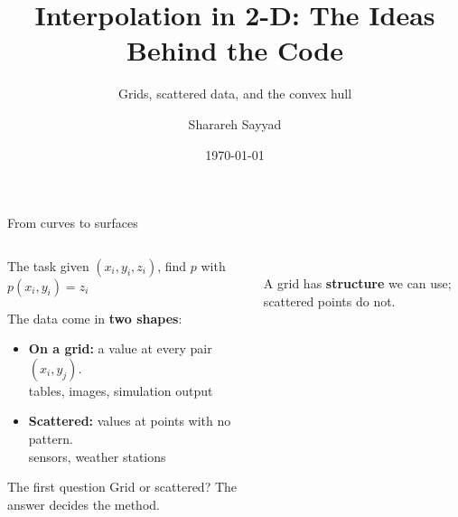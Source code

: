 \documentclass[aspectratio=169]{beamer}
\title{Interpolation in 2-D: The Ideas Behind the Code}
\subtitle{Grids, scattered data, and the convex hull}
\author{Sharareh Sayyad}
\institute{Washington State University}
\date{\today}
\newcommand{\cbox}[2]{\colorbox{#1}{\ensuremath{\displaystyle #2}}}
\begin{document}
\frame{\titlepage}

\begin{frame}{From curves to surfaces}
\begin{columns}[c]
\begin{column}{0.46\textwidth}
\small
\begin{block}{The task}
\footnotesize
given $(x_i, y_i, z_i)$, find $p$ with \cbox{accent!12}{p(x_i, y_i) = z_i}
\end{block}
The data come in \textbf{two shapes}:
\begin{itemize}
  \setlength{\itemsep}{2pt}
  \item \textbf{On a grid:} a value at every pair $(x_i, y_j)$.\\
  \footnotesize tables, images, simulation output
  \small
  \item \textbf{Scattered:} values at points with no pattern.\\
  \footnotesize sensors, weather stations
\end{itemize}
\vspace{0.1cm}
\begin{exampleblock}{The first question}
\footnotesize
Grid or scattered? The answer decides the method.
\end{exampleblock}
\end{column}
\begin{column}{0.52\textwidth}
\centering
{}\\[4pt]
\footnotesize A grid has \textbf{structure} we can use; scattered points do not.
\end{column}
\end{columns}
\end{frame}
\end{document}
